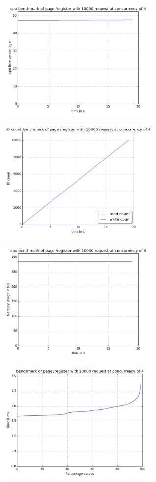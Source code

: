 \begin{center}
\includegraphics[width=0.6\textwidth]{img/register.cpu.png}



\includegraphics[width=0.6\textwidth]{img/register.io-count.png}



\includegraphics[width=0.6\textwidth]{img/register.mem.png}



\includegraphics[width=0.6\textwidth]{img/register.serv-time.png}




\end{center}
